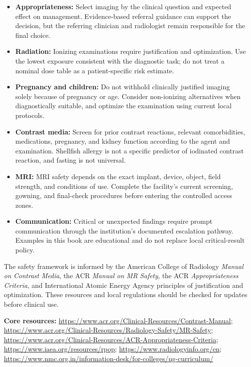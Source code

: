 \documentclass[12pt,oneside]{book}
\begin{document}
\begin{itemize}
    \item \textbf{Appropriateness:} Select imaging by the clinical question and expected effect on management. Evidence-based referral guidance can support the decision, but the referring clinician and radiologist remain responsible for the final choice.
    \item \textbf{Radiation:} Ionizing examinations require justification and optimization. Use the lowest exposure consistent with the diagnostic task; do not treat a nominal dose table as a patient-specific risk estimate.
    \item \textbf{Pregnancy and children:} Do not withhold clinically justified imaging solely because of pregnancy or age. Consider non-ionizing alternatives when diagnostically suitable, and optimize the examination using current local protocols.
    \item \textbf{Contrast media:} Screen for prior contrast reactions, relevant comorbidities, medications, pregnancy, and kidney function according to the agent and examination. Shellfish allergy is not a specific predictor of iodinated contrast reaction, and fasting is not universal.
    \item \textbf{MRI:} MRI safety depends on the exact implant, device, object, field strength, and conditions of use. Complete the facility's current screening, gowning, and final-check procedures before entering the controlled access zones.
    \item \textbf{Communication:} Critical or unexpected findings require prompt communication through the institution's documented escalation pathway. Examples in this book are educational and do not replace local critical-result policy.
\end{itemize}

The safety framework is informed by the American College of Radiology \textit{Manual on Contrast Media}, the ACR \textit{Manual on MR Safety}, the ACR \textit{Appropriateness Criteria}, and International Atomic Energy Agency principles of justification and optimization. These resources and local regulations should be checked for updates before clinical use.

\textbf{Core resources:} \url{https://www.acr.org/Clinical-Resources/Contrast-Manual}; \url{https://www.acr.org/Clinical-Resources/Radiology-Safety/MR-Safety}; \url{https://www.acr.org/Clinical-Resources/ACR-Appropriateness-Criteria}; \url{https://www.iaea.org/resources/rpop}; \url{https://www.radiologyinfo.org/en}; \url{https://www.nmc.org.in/information-desk/for-colleges/ug-curriculum/}
\end{document}

